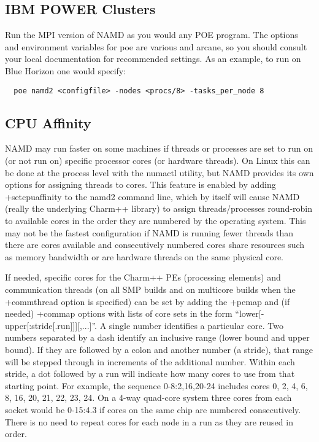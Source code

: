 \subsection{IBM POWER Clusters}

Run the MPI version of NAMD as you would any POE program.  The options
and environment variables for poe are various and arcane, so you should
consult your local documentation for recommended settings.  As an
example, to run on Blue Horizon one would specify:

\begin{verbatim}
  poe namd2 <configfile> -nodes <procs/8> -tasks_per_node 8
\end{verbatim}

\subsection{CPU Affinity}

NAMD may run faster on some machines if threads or processes are set to
run on (or not run on) specific processor cores (or hardware threads).
On Linux this can be done at the process level with the numactl utility,
but NAMD provides its own options for assigning threads to cores.  This
feature is enabled by adding +setcpuaffinity to the namd2 command line,
which by itself will cause NAMD (really the underlying Charm++ library)
to assign threads/processes round-robin to available cores in the order
they are numbered by the operating system.  This may not be the fastest
configuration if NAMD is running fewer threads than there are cores
available and consecutively numbered cores share resources such as
memory bandwidth or are hardware threads on the same physical core.

If needed, specific cores for the Charm++ PEs (processing elements) and
communication threads (on all SMP builds and on multicore builds when
the +commthread option is specified) can be set by adding the +pemap
and (if needed) +commap options with lists of core sets in the form
``lower[-upper[:stride[.run]]][,...]''.  A single number identifies a
particular core.  Two numbers separated by a dash identify an inclusive
range (lower bound and upper bound).  If they are followed by a colon and
another number (a stride), that range will be stepped through in increments
of the additional number.  Within each stride, a dot followed by a run will
indicate how many cores to use from that starting point.  For example, the
sequence 0-8:2,16,20-24 includes cores 0, 2, 4, 6, 8, 16, 20, 21, 22, 23, 24.
On a 4-way quad-core system three cores from each socket would be 0-15:4.3
if cores on the same chip are numbered consecutively.  There is no need
to repeat cores for each node in a run as they are reused in order.

